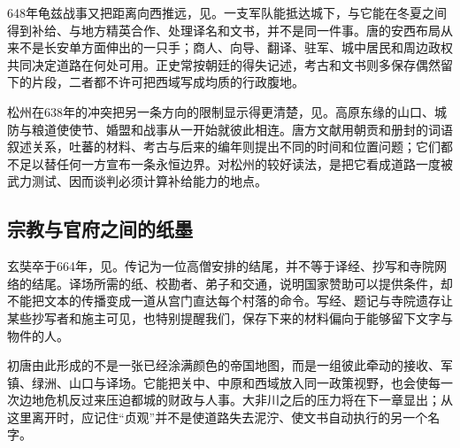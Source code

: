 648年龟兹战事又把距离向西推远，见。一支军队能抵达城下，与它能在冬夏之间得到补给、与地方精英合作、处理译名和文书，并不是同一件事。唐的安西布局从来不是长安单方面伸出的一只手；商人、向导、翻译、驻军、城中居民和周边政权共同决定道路在何处可用。正史常按朝廷的得失记述，考古和文书则多保存偶然留下的片段，二者都不许可把西域写成均质的行政腹地。

松州在638年的冲突把另一条方向的限制显示得更清楚，见。高原东缘的山口、城防与粮道使使节、婚盟和战事从一开始就彼此相连。唐方文献用朝贡和册封的词语叙述关系，吐蕃的材料、考古与后来的编年则提出不同的时间和位置问题；它们都不足以替任何一方宣布一条永恒边界。对松州的较好读法，是把它看成道路一度被武力测试、因而谈判必须计算补给能力的地点。

\subsection{宗教与官府之间的纸墨}
玄奘卒于664年，见。传记为一位高僧安排的结尾，并不等于译经、抄写和寺院网络的结尾。译场所需的纸、校勘者、弟子和交通，说明国家赞助可以提供条件，却不能把文本的传播变成一道从宫门直达每个村落的命令。写经、题记与寺院遗存让某些抄写者和施主可见，也特别提醒我们，保存下来的材料偏向于能够留下文字与物件的人。

初唐由此形成的不是一张已经涂满颜色的帝国地图，而是一组彼此牵动的接收、军镇、绿洲、山口与译场。它能把关中、中原和西域放入同一政策视野，也会使每一次边地危机反过来压迫都城的财政与人事。大非川之后的压力将在下一章显出；从这里离开时，应记住“贞观”并不是使道路失去泥泞、使文书自动执行的另一个名字。




























